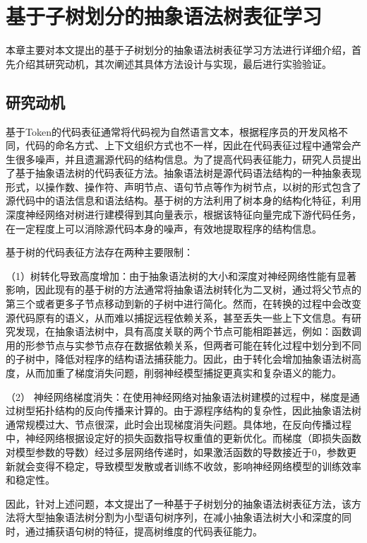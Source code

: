 \chapter{基于子树划分的抽象语法树表征学习}
\label{chap:AST}
本章主要对本文提出的基于子树划分的抽象语法树表征学习方法进行详细介绍，首先介绍其研究动机，其次阐述其具体方法设计与实现，最后进行实验验证。

\section{研究动机}
\label{sec:ASTMotivation}
基于Token的代码表征通常将代码视为自然语言文本，根据程序员的开发风格不同，代码的命名方式、上下文组织方式也不一样，因此在代码表征过程中通常会产生很多噪声，并且遗漏源代码的结构信息。为了提高代码表征能力，研究人员提出了基于抽象语法树的代码表征方法。抽象语法树是源代码语法结构的一种抽象表现形式，以操作数、操作符、声明节点、语句节点等作为树节点，以树的形式包含了源代码中的语法信息和语法结构。基于树的方法利用了树本身的结构化特征，利用深度神经网络对树进行建模得到其向量表示，根据该特征向量完成下游代码任务，在一定程度上可以消除源代码本身的噪声，有效地提取程序的结构信息。

基于树的代码表征方法存在两种主要限制：

（1）树转化导致高度增加：由于抽象语法树的大小和深度对神经网络性能有显著影响，因此现有的基于树的方法通常将抽象语法树转化为二叉树，通过将父节点的第三个或者更多子节点移动到新的子树中进行简化。然而，在转换的过程中会改变源代码原有的语义，从而难以捕捉远程依赖关系，甚至丢失一些上下文信息。有研究发现\cite{Allamanis2017LearningTR}，在抽象语法树中，具有高度关联的两个节点可能相距甚远，例如：函数调用的形参节点与实参节点存在数据依赖关系，但两者可能在转化过程中划分到不同的子树中，降低对程序的结构语法捕获能力。因此，由于转化会增加抽象语法树高度，从而加重了梯度消失问题，削弱神经模型捕捉更真实和复杂语义的能力。

（2） 神经网络梯度消失：在使用神经网络对抽象语法树建模的过程中，梯度是通过树型拓扑结构的反向传播来计算的。由于源程序结构的复杂性，因此抽象语法树通常规模过大、节点很深，此时会出现梯度消失问题。具体地，在反向传播过程中，神经网络根据设定好的损失函数指导权重值的更新优化。而梯度（即损失函数对模型参数的导数）经过多层网络传递时，如果激活函数的导数接近于0，参数更新就会变得不稳定，导致模型发散或者训练不收敛，影响神经网络模型的训练效率和稳定性。

因此，针对上述问题，本文提出了一种基于子树划分的抽象语法树表征方法，该方法将大型抽象语法树分割为小型语句树序列，在减小抽象语法树大小和深度的同时，通过捕获语句树的特征，提高树维度的代码表征能力。

